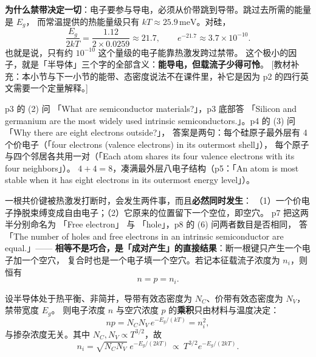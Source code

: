 \documentclass[11pt]{ctexart}
\begin{document}
\textbf{为什么禁带决定一切}：电子要参与导电，必须从价带跳到导带。跳过去所需的能量是 $E_g$，
而常温提供的热能量级只有 $kT\approx25.9\,\mathrm{meV}$。对硅，
\[
\frac{E_g}{2kT}=\frac{1.12}{2\times0.0259}\approx21.7,
\qquad
e^{-21.7}\approx3.7\times10^{-10}.
\]
也就是说，只有约 $10^{-10}$ 这个量级的电子能靠热激发跨过禁带。
这个极小的因子，就是「半导体」三个字的全部含义：\textbf{能导电，但载流子少得可怜}。
[教材补充：本小节与下一小节的能带、态密度说法不在课件里，补它是因为 p2 的四行英文需要一个定量解释。]


p3 的 (2) 问 「What are semiconductor materials?」，p3 底部答 「Silicon and germanium are the
most widely used intrinsic semiconductors.」。p4 的 (3) 问 「Why there are eight electrons outside?」，
答案是两句：每个硅原子最外层有 4 个价电子（「four electrons (valence electrons) in its outermost shell」），
每个原子与四个邻居各共用一对（「Each atom shares its four valence electrons with its four neighbors」）。
$4+4=8$，凑满最外层八电子结构（p5：「An atom is most stable when it has eight electrons in its
outermost energy level」）。

一根共价键被热激发打断时，会发生两件事，而且\textbf{必然同时发生}：
（1）一个价电子挣脱束缚变成自由电子；（2）它原来的位置留下一个空位，即空穴。
p7 把这两半分别命名为 「Free electron」 与 「hole」，p8 的 (6) 问两者数目是否相同，
答 「The number of holes and free electrons in an intrinsic semiconductor are equal.」——
\textbf{相等不是巧合，是「成对产生」的直接结果}：断一根键只产生一个电子加一个空穴，
复合时也是一个电子填一个空穴。若记本征载流子浓度为 $n_i$，则恒有
\[
n=p=n_i .
\]

\begin{center}
\begin{minipage}{0.94\linewidth}
设半导体处于热平衡、非简并，导带有效态密度为 $N_C$、价带有效态密度为 $N_V$，禁带宽度 $E_g$。
则电子浓度 $n$ 与空穴浓度 $p$ 的\textbf{乘积}只由材料与温度决定：
\[
np=N_C N_V\,e^{-E_g/(kT)}=n_i^2 ,
\]
与掺杂浓度无关。其中 $N_C,N_V\propto T^{3/2}$，故
\[
n_i=\sqrt{N_C N_V}\;e^{-E_g/(2kT)}\ \propto\ T^{3/2}e^{-E_g/(2kT)} .
\]
\end{minipage}
\end{center}
\end{document}
